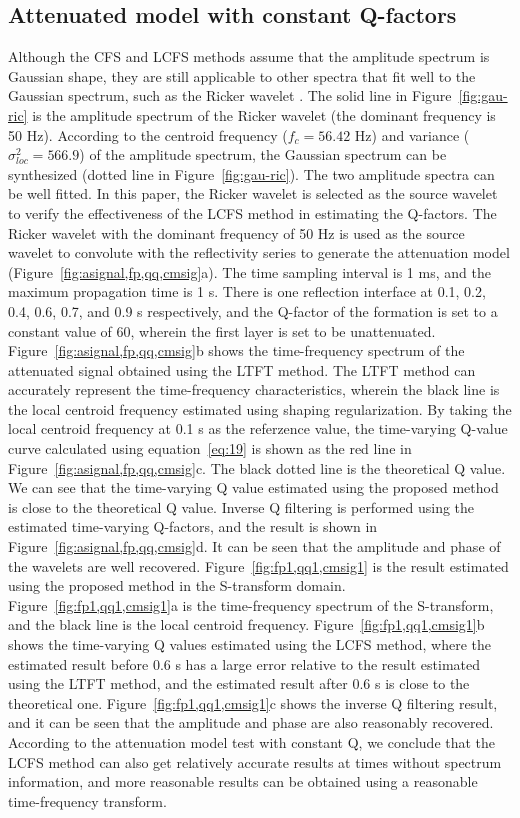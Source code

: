 \subsection{Attenuated model with constant Q-factors}

Although the CFS and LCFS methods assume that the amplitude spectrum
is Gaussian shape, they are still applicable to other spectra that fit
well to the Gaussian spectrum, such as the Ricker wavelet
\cite[]{Quan97}. The solid line in Figure~\ref{fig:gau-ric} is the
amplitude spectrum of the Ricker wavelet (the dominant frequency is 50
Hz). According to the centroid frequency ($f_c=56.42$ Hz) and variance
($\sigma_{loc}^2=566.9$) of the amplitude spectrum, the Gaussian
spectrum can be synthesized (dotted line in
Figure~\ref{fig:gau-ric}). The two amplitude spectra can be well
fitted. In this paper, the Ricker wavelet is selected as the source
wavelet to verify the effectiveness of the LCFS method in estimating
the Q-factors. The Ricker wavelet with the dominant frequency of 50 Hz
is used as the source wavelet to convolute with the reflectivity
series to generate the attenuation model
(Figure~\ref{fig:asignal,fp,qq,cmsig}a). The time sampling interval is
1 ms, and the maximum propagation time is 1 s. There is one reflection
interface at 0.1, 0.2, 0.4, 0.6, 0.7, and 0.9 s respectively, and the
Q-factor of the formation is set to a constant value of 60, wherein
the first layer is set to be
unattenuated. Figure~\ref{fig:asignal,fp,qq,cmsig}b shows the
time-frequency spectrum of the attenuated signal obtained using the
LTFT method. The LTFT method can accurately represent the
time-frequency characteristics, wherein the black line is the local
centroid frequency estimated using shaping regularization. By taking
the local centroid frequency at 0.1 s as the referzence value, the
time-varying Q-value curve calculated using equation~\ref{eq:19} is
shown as the red line in Figure~\ref{fig:asignal,fp,qq,cmsig}c. The
black dotted line is the theoretical Q value. We can see that the
time-varying Q value estimated using the proposed method is close to
the theoretical Q value. Inverse Q filtering is performed using the
estimated time-varying Q-factors, and the result is shown in
Figure~\ref{fig:asignal,fp,qq,cmsig}d. It can be seen that the
amplitude and phase of the wavelets are well recovered.
Figure~\ref{fig:fp1,qq1,cmsig1} is the result estimated using the
proposed method in the S-transform
domain. Figure~\ref{fig:fp1,qq1,cmsig1}a is the time-frequency
spectrum of the S-transform, and the black line is the local centroid
frequency. Figure~\ref{fig:fp1,qq1,cmsig1}b shows the time-varying Q
values estimated using the LCFS method, where the estimated result
before 0.6 s has a large error relative to the result estimated using
the LTFT method, and the estimated result after 0.6 s is close to the
theoretical one.  Figure~\ref{fig:fp1,qq1,cmsig1}c shows the inverse Q
filtering result, and it can be seen that the amplitude and phase are
also reasonably recovered.  According to the attenuation model test
with constant Q, we conclude that the LCFS method can also get
relatively accurate results at times without spectrum information, and
more reasonable results can be obtained using a reasonable
time-frequency transform.


